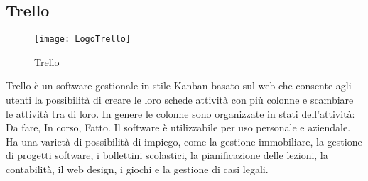 \subsection{Trello}
\begin{figure}[htpb!]
\center
  \texttt{[image: LogoTrello]}
  \caption{Trello}
\end{figure}
Trello è un software gestionale in stile Kanban basato sul web che consente agli utenti la possibilità di creare le loro schede attività con più colonne e scambiare le attività tra di loro. In genere le colonne sono organizzate in stati dell'attività: Da fare, In corso, Fatto. Il software è utilizzabile per uso personale e aziendale. Ha una varietà di possibilità di impiego, come la gestione immobiliare, la gestione di progetti software, i bollettini scolastici, la pianificazione delle lezioni, la contabilità, il web design, i giochi e la gestione di casi legali.

\newpage
